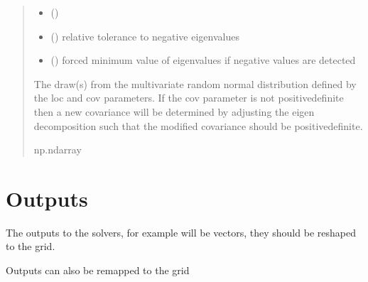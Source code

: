 \documentclass[letterpaper,10pt,english]{sphinxmanual}
\begin{document}
\begin{fulllineitems}
\begin{quote}
\begin{description}
\begin{itemize}
\item {}
\sphinxAtStartPar
{} ()

\item {}
\sphinxAtStartPar
{} () \textendash{} relative tolerance to negative eigenvalues

\item {}
\sphinxAtStartPar
{} () \textendash{} forced minimum value of eigenvalues if negative values are detected

\end{itemize}

\sphinxAtStartPar
{} \textendash{} The draw(s) from the multivariate random normal distribution defined
by the loc and cov parameters. If the cov parameter is not
positive\sphinxhyphen{}definite then a new covariance will be determined by adjusting
the eigen decomposition such that the modified covariance should be
positive\sphinxhyphen{}definite.

\sphinxAtStartPar
np.ndarray

\end{description}\end{quote}

\end{fulllineitems}



\section{Outputs}
\label{\detokenize{kriging:outputs}}
\sphinxAtStartPar
The outputs to the solvers,  for example will be
vectors, they should be re\sphinxhyphen{}shaped to the grid.

\sphinxAtStartPar
Outputs can also be re\sphinxhyphen{}mapped to the grid
\end{document}
